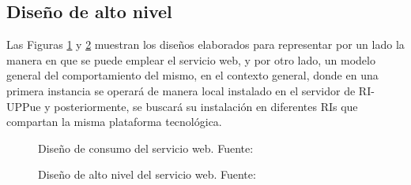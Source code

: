 \subsection{Dise\~{n}o de alto nivel}

Las Figuras \ref{disenoAlto1} y \ref{disenoAlto2} muestran los dise\~{n}os elaborados para representar por un lado la manera en que se puede emplear el servicio web, y por otro lado, un modelo general del comportamiento del mismo, en el contexto general, donde en una primera instancia se operar\'a de manera local instalado en el servidor de RI-UPPue y posteriormente, se buscar\'a su instalaci\'on en diferentes RIs que compartan la misma plataforma tecnol\'ogica.

\begin{figure}[!ht]
	\centering
    \caption{Dise\~{n}o de consumo del servicio web. Fuente: \cite{SOMIdiseno}} %
    \label{disenoAlto1}
\end{figure}

\begin{figure}[!ht]
	\centering
    \caption{Dise\~{n}o de alto nivel del servicio web. Fuente: \cite{SOMIdiseno}} %
    \label{disenoAlto2}
\end{figure}

